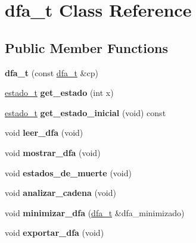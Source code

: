 \hypertarget{classdfa__t}{}\section{dfa\+\_\+t Class Reference}
\label{classdfa__t}
\subsection*{Public Member Functions}
\begin{DoxyCompactItemize}
\item 
\hypertarget{classdfa__t_a4805bccab2069121d884099be9793d6b}{}\label{classdfa__t_a4805bccab2069121d884099be9793d6b} 
{\bfseries dfa\+\_\+t} (const \hyperlink{classdfa__t}{dfa\+\_\+t} \&cp)
\item 
\hypertarget{classdfa__t_ada3ce10114c38f69ffec02e2bd6146d0}{}\label{classdfa__t_ada3ce10114c38f69ffec02e2bd6146d0} 
\hyperlink{classestado__t}{estado\+\_\+t} {\bfseries get\+\_\+estado} (int x)
\item 
\hypertarget{classdfa__t_a14fcfde2bfbc1fbef8054fdc35f4eb32}{}\label{classdfa__t_a14fcfde2bfbc1fbef8054fdc35f4eb32} 
\hyperlink{classestado__t}{estado\+\_\+t} {\bfseries get\+\_\+estado\+\_\+inicial} (void) const
\item 
\hypertarget{classdfa__t_a4dc68b8f63c1eaa24e77eae27ca2b85b}{}\label{classdfa__t_a4dc68b8f63c1eaa24e77eae27ca2b85b} 
void {\bfseries leer\+\_\+dfa} (void)
\item 
\hypertarget{classdfa__t_a9169367d64f83fd0e0d7ffcb19718c8a}{}\label{classdfa__t_a9169367d64f83fd0e0d7ffcb19718c8a} 
void {\bfseries mostrar\+\_\+dfa} (void)
\item 
\hypertarget{classdfa__t_a7163af6ae4232618706a4fac9e106bd1}{}\label{classdfa__t_a7163af6ae4232618706a4fac9e106bd1} 
void {\bfseries estados\+\_\+de\+\_\+muerte} (void)
\item 
\hypertarget{classdfa__t_a12467a4333dbc1bf20abb9d6a944ca78}{}\label{classdfa__t_a12467a4333dbc1bf20abb9d6a944ca78} 
void {\bfseries analizar\+\_\+cadena} (void)
\item 
\hypertarget{classdfa__t_abbbd26b5bdfdd59754dd43a0c45cceef}{}\label{classdfa__t_abbbd26b5bdfdd59754dd43a0c45cceef} 
void {\bfseries minimizar\+\_\+dfa} (\hyperlink{classdfa__t}{dfa\+\_\+t} \&dfa\+\_\+minimizado)
\item 
\hypertarget{classdfa__t_a3cadbfce756a7b08580e27b2a255d36f}{}\label{classdfa__t_a3cadbfce756a7b08580e27b2a255d36f} 
void {\bfseries exportar\+\_\+dfa} (void)
\item 

\end{DoxyCompactItemize}

